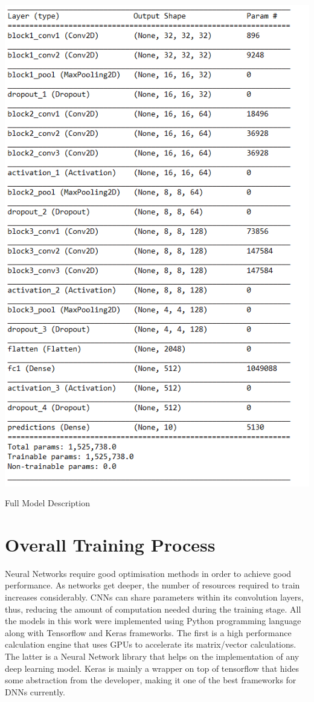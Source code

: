 \begin{table}[!h]
	\centering
	\includegraphics[scale=0.9]{vgg_arch.png}
	\caption{Full Model Description}
	\label{tbl:vgg10}
\end{table}
 
\section{Overall Training Process}

Neural Networks require good optimisation methods in order to achieve good performance. As networks get deeper, the number of resources required to train increases considerably. CNNs can share parameters within its convolution layers, thus, reducing the amount of computation needed during the training stage. All the models in this work were implemented using Python programming language along with Tensorflow and Keras frameworks. The first is a high performance calculation engine that uses GPUs to accelerate its matrix/vector calculations. The latter is a Neural Network library that helps on the implementation of any deep learning model. Keras is mainly a wrapper on top of tensorflow that hides some abstraction from the developer, making it one of the best frameworks for DNNs currently.

